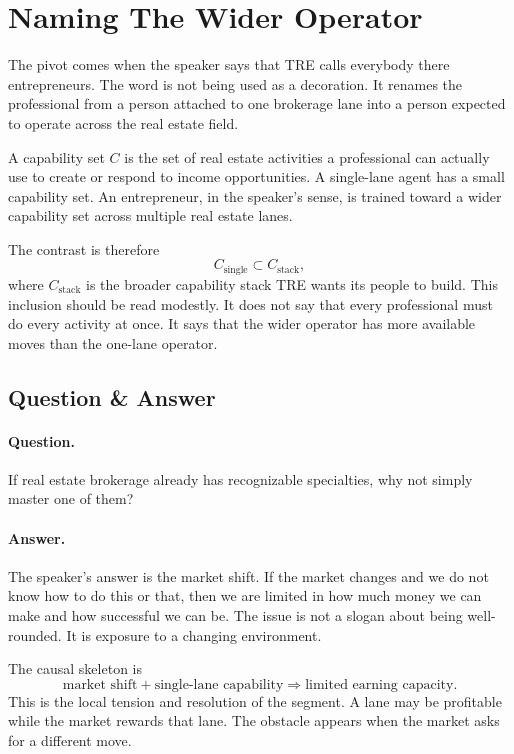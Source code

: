 \section{Naming The Wider Operator}

The pivot comes when the speaker says that TRE calls everybody there entrepreneurs. The word is not being used as a decoration. It renames the professional from a person attached to one brokerage lane into a person expected to operate across the real estate field.

\begin{definition}
A capability set \(C\) is the set of real estate activities a professional can actually use to create or respond to income opportunities. A single-lane agent has a small capability set. An entrepreneur, in the speaker's sense, is trained toward a wider capability set across multiple real estate lanes.
\end{definition}

The contrast is therefore
\begin{equation}
C_{\text{single}}
\subset
C_{\text{stack}},
\end{equation}
where \(C_{\text{stack}}\) is the broader capability stack TRE wants its people to build. This inclusion should be read modestly. It does not say that every professional must do every activity at once. It says that the wider operator has more available moves than the one-lane operator.

\subsection{Question \& Answer}

\paragraph{Question.} If real estate brokerage already has recognizable specialties, why not simply master one of them?

\paragraph{Answer.} The speaker's answer is the market shift. If the market changes and we do not know how to do this or that, then we are limited in how much money we can make and how successful we can be. The issue is not a slogan about being well-rounded. It is exposure to a changing environment.

The causal skeleton is
\begin{equation}
\text{market shift}
+
\text{single-lane capability}
\Longrightarrow
\text{limited earning capacity}.
\end{equation}
This is the local tension and resolution of the segment. A lane may be profitable while the market rewards that lane. The obstacle appears when the market asks for a different move.

